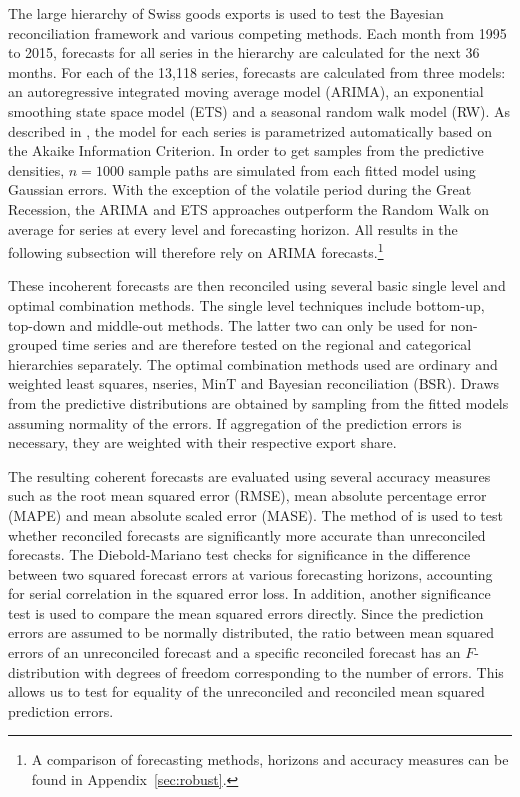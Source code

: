 \documentclass[a4paper,fleqn,11pt]{article}
\begin{document}
The large hierarchy of Swiss goods exports is used to test the Bayesian reconciliation framework and various competing methods. Each month from 1995 to 2015, forecasts for all series in the hierarchy are calculated for the next 36 months. For each of the 13,118 series, forecasts are calculated from three models: an autoregressive integrated moving average model (ARIMA), an exponential smoothing state space model (ETS) and a seasonal random walk model (RW). As described in \cite{Hyndman2008}, the model for each series is parametrized automatically based on the Akaike Information Criterion. In order to get samples from the predictive densities, $n = 1000$ sample paths are simulated from each fitted model using Gaussian errors. With the exception of the volatile period during the Great Recession, the ARIMA and ETS approaches outperform the Random Walk on average for series at every level and forecasting horizon. All results in the following subsection will therefore rely on ARIMA forecasts.\footnote{A comparison of forecasting methods, horizons and accuracy measures can be found in Appendix~\ref{sec:robust}.}

These incoherent forecasts are then reconciled using several basic single level and optimal combination methods. The single level techniques include bottom-up, top-down and middle-out methods. The latter two can only be used for non-grouped time series and are therefore tested on the regional and categorical hierarchies separately. The optimal combination methods used are ordinary and weighted least squares, nseries, MinT and Bayesian reconciliation (BSR). Draws from the predictive distributions are obtained by sampling from the fitted models assuming normality of the errors. If aggregation of the prediction errors is necessary, they are weighted with their respective export share.

The resulting coherent forecasts are evaluated using several accuracy measures such as the root mean squared error (RMSE), mean absolute percentage error (MAPE) and mean absolute scaled error (MASE). The method of \cite{Diebold1995} is used to test whether reconciled forecasts are significantly more accurate than unreconciled forecasts. The Diebold-Mariano test checks for significance in the difference between two squared forecast errors at various forecasting horizons, accounting for serial correlation in the squared error loss. In addition, another significance test is used to compare the mean squared errors directly. Since the prediction errors are assumed to be normally distributed, the ratio between mean squared errors of an unreconciled forecast and a specific reconciled forecast has an $F$-distribution with degrees of freedom corresponding to the number of errors. This allows us to test for equality of the unreconciled and reconciled mean squared prediction errors.
\end{document}
